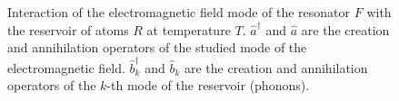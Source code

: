 \begin{figure}
\centering



\caption{Interaction of the electromagnetic field mode of the resonator $F$ with
  the reservoir of atoms $R$ at temperature $T$. $\hat{a}^{\dag}$ and
$\hat{a}$ are the creation and annihilation operators of the studied mode
of the electromagnetic field. $\hat{b}_k^{\dag}$ and
$\hat{b}_k$ are the creation and annihilation operators of the $k$-th mode of the reservoir (phonons).}
\label{figPart1Ch2_add3}
\end{figure}
